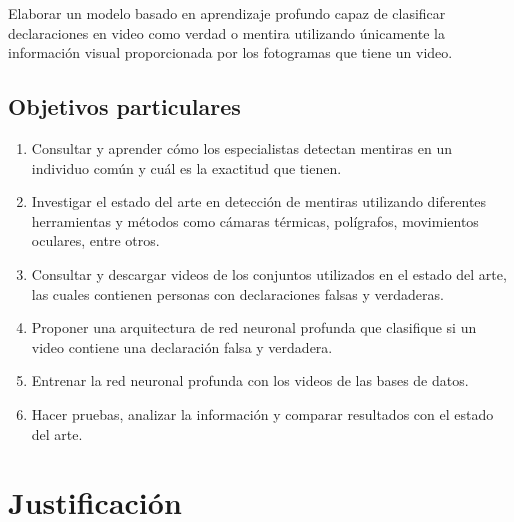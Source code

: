 \begin{onehalfspacing}

Elaborar un modelo basado en aprendizaje profundo capaz de clasificar declaraciones en video como verdad o mentira utilizando únicamente la información visual proporcionada por los fotogramas que tiene un video.
\subsection{Objetivos particulares}
\label{subsec:Objetivos_particulares}
\begin{enumerate}

    \item Consultar y aprender cómo los especialistas detectan mentiras en un individuo común y cuál es la exactitud que tienen.
    \item Investigar el estado del arte en detección de mentiras utilizando diferentes herramientas  y métodos como cámaras térmicas,  polígrafos, movimientos oculares, entre otros.
    \item Consultar y descargar videos de los conjuntos utilizados en el estado del arte, las cuales contienen personas con declaraciones falsas y verdaderas. 
    \item Proponer una arquitectura de red neuronal profunda que clasifique si un video contiene una declaración falsa y verdadera.
    \item Entrenar la red neuronal profunda con los videos de las bases de datos.
    \item Hacer pruebas, analizar la información y comparar resultados con el estado del arte.
    
\end{enumerate}

\section{Justificación}
\label{subsec:Justificaci0n}


\end{onehalfspacing}
